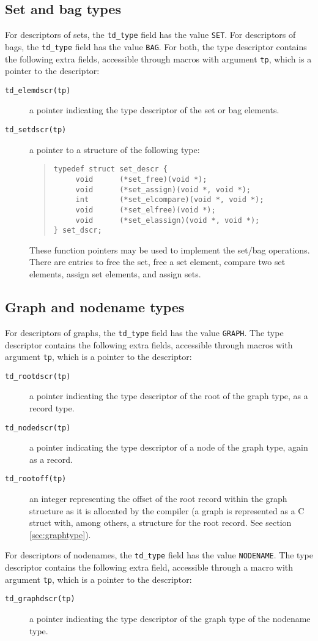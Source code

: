 \documentclass[10pt]{article}
\begin{document}
\subsection{Set and bag types}
For descriptors of sets, the \verb+td_type+
field has the value \verb+SET+.
For descriptors of bags, the \verb+td_type+
field has the value \verb+BAG+.
For both,
the type descriptor contains the following extra fields, accessible through
macros with argument \verb+tp+, which is a pointer to the descriptor:
\begin{description}
\item[{\tt td\_elemdscr(tp)}]
a pointer indicating the type descriptor of the set or bag elements.
\item[{\tt td\_setdscr(tp)}]
a pointer to a structure of the following type:
\begin{quote}
\begin{verbatim}
typedef struct set_descr {
     void      (*set_free)(void *);
     void      (*set_assign)(void *, void *);
     int       (*set_elcompare)(void *, void *);
     void      (*set_elfree)(void *);
     void      (*set_elassign)(void *, void *);
} set_dscr;
\end{verbatim}
\end{quote}
These function pointers may be used to implement the set/bag operations.
There are entries to free the set, free a set element, compare two set elements,
assign set elements, and assign sets.
\end{description}

\subsection{Graph and nodename types}
For descriptors of graphs, the \verb+td_type+
field has the value \verb+GRAPH+.
The type descriptor contains the following extra fields, accessible through
macros with argument \verb+tp+, which is a pointer to the descriptor:
\begin{description}
\item[{\tt td\_rootdscr(tp)}]
a pointer indicating the type descriptor of the root of the
graph type, as a record type.
\item[{\tt td\_nodedscr(tp)}]
a pointer indicating the type descriptor of a node of the
graph type, again as a record.
\item[{\tt td\_rootoff(tp)}]
an integer representing the offset of the root record within the
graph structure as it is allocated by the compiler
(a graph is represented as a C struct with,
among others, a structure for the root record.
See section \ref{sec:graphtype}).
\end{description}
For descriptors of nodenames, the \verb+td_type+
field has the value \verb+NODENAME+.
The type descriptor contains the following extra field, accessible through
a macro with argument \verb+tp+, which is a pointer to the descriptor:
\begin{description}
\item[{\tt td\_graphdscr(tp)}]
a pointer indicating the type descriptor of the graph type of
the nodename type.
\end{description}
\end{document}
